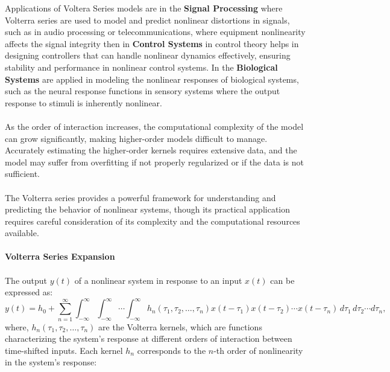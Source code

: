 \documentclass[12pt]{article}
\begin{document}
\noindent Applications of Voltera Series models are in the \textbf{Signal Processing} where Volterra series
are used to model and predict nonlinear distortions in signals, such as
in audio processing or telecommunications, where equipment nonlinearity affects the
signal integrity then in \textbf{Control Systems} in control theory helps in designing controllers
that can handle nonlinear dynamics effectively, ensuring stability and performance in
nonlinear control systems. In the \textbf{Biological Systems} are applied in modeling
the nonlinear responses of biological systems, such as the neural response functions
in sensory systems where the output response to stimuli is inherently nonlinear.\\
\\
As the order of interaction increases, the computational complexity of the model can
grow significantly, making higher-order models difficult to manage. Accurately estimating
the higher-order kernels requires extensive data, and the model may suffer from
overfitting if not properly regularized or if the data is not sufficient.\\
\\
The Volterra series provides a powerful framework for understanding and predicting
the behavior of nonlinear systems, though its practical application requires careful
consideration of its complexity and the computational resources available.\\
\\
\textbf{Volterra Series Expansion}\\
\\
The output \( y(t) \) of a nonlinear system in response to an input \( x(t) \) can be
expressed as:
\begin{equation}
    y(t) = h_0 + \sum_{n=1}^{\infty} \int_{-\infty}^\infty \int_{-\infty}^\infty \cdots \int_{-\infty}^\infty h_n(\tau_1, \tau_2, \ldots, \tau_n) x(t-\tau_1) x(t-\tau_2) \cdots x(t-\tau_n) \, d\tau_1 \, d\tau_2 \cdots d\tau_n,
\end{equation}
\noindent where, \( h_n(\tau_1, \tau_2, \ldots, \tau_n) \) are the Volterra kernels, which
are functions characterizing the system's response at different orders of interaction
between time-shifted inputs. Each kernel \( h_n \) corresponds to the \( n \)-th order
of nonlinearity in the system's response:\\
\end{document}
